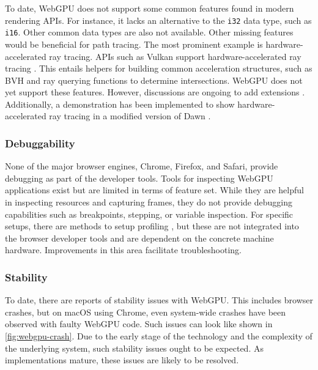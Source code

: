 To date, \gls{WebGPU} does not support some common features found in modern rendering \glspl{API}. For instance, it lacks an alternative to the \texttt{i32} data type, such as \texttt{i16}. Other common data types are also not available. Other missing features would be beneficial for path tracing. The most prominent example is hardware-accelerated ray tracing. \glspl{API} such as \gls{Vulkan} support hardware-accelerated ray tracing \cite{vulkanRayTracing}. This entails helpers for building common acceleration structures, such as \gls{BVH} and ray querying functions to determine intersections. \gls{WebGPU} does not yet support these features. However, discussions are ongoing to add extensions \cite{webGPURayTracing}. Additionally, a demonstration has been implemented to show hardware-accelerated ray tracing in a modified version of \gls{Dawn} \cite{webGPURayTracingFork}.

\subsubsection*{Debuggability}

None of the major browser engines, Chrome, Firefox, and Safari, provide debugging as part of the developer tools. Tools for inspecting \gls{WebGPU} applications exist \cite{webGpuDevToolsDuncan, webGpuDevToolsTakahiro} but are limited in terms of feature set. While they are helpful in inspecting resources and capturing frames, they do not provide debugging capabilities such as breakpoints, stepping, or variable inspection. For specific setups, there are methods to setup profiling \cite{webGpuProfilingWithPix}, but these are not integrated into the browser developer tools and are dependent on the concrete machine hardware. Improvements in this area facilitate troubleshooting.

\subsubsection*{Stability}

To date, there are reports of stability issues with \gls{WebGPU}. This includes browser crashes, but on macOS using Chrome, even system-wide crashes have been observed with faulty \gls{WebGPU} code. Such issues can look like shown in \autoref{fig:webgpu-crash}. Due to the early stage of the technology and the complexity of the underlying system, such stability issues ought to be expected. As implementations mature, these issues are likely to be resolved.

